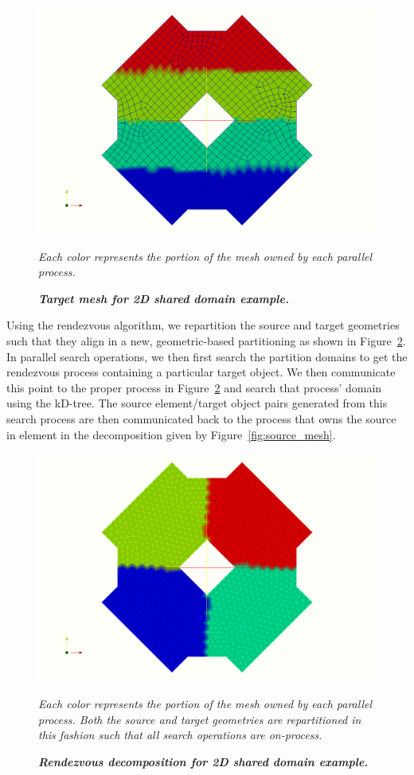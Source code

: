 \documentclass[letterpaper,12pt]{article}
\begin{document}
\begin{figure}[htpb!]
  \centering \includegraphics[width=5.5in]{quad_part.png}
  \caption{\bf \sl Target mesh for 2D shared domain example.}{\sl Each
    color represents the portion of the mesh owned by each parallel
    process.}
  \label{fig:target_mesh}
\end{figure}
 
Using the rendezvous algorithm, we repartition the source and target
geometries such that they align in a new, geometric-based partitioning
as shown in Figure~\ref{fig:rendezvous_part}. In parallel search
operations, we then first search the partition domains to get the
rendezvous process containing a particular target object. We then
communicate this point to the proper process in
Figure~\ref{fig:rendezvous_part} and search that process' domain using
the kD-tree. The source element/target object pairs generated from
this search process are then communicated back to the process that
owns the source in element in the decomposition given by
Figure~\ref{fig:source_mesh}.

\begin{figure}[htpb!]
  \centering \includegraphics[width=5.5in]{tri_rend.png}
  \caption{\bf \sl Rendezvous decomposition for 2D shared domain
    example.}{\sl Each color represents the portion of the mesh owned
    by each parallel process. Both the source and target geometries
    are repartitioned in this fashion such that all search operations
    are on-process.}
  \label{fig:rendezvous_part}
\end{figure}
\end{document}
